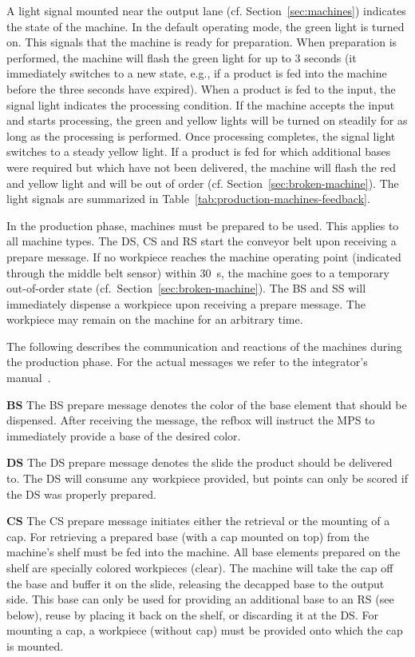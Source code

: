 \documentclass[12pt,twoside]{article}
\newcommand{\refsec}[1]{Section~\ref{#1}}
\newcommand{\reftab}[1]{Table~\ref{#1}}
\begin{document}
A light signal mounted near the output lane
(cf. \refsec{sec:machines}) indicates the state of the machine. In the
default operating mode, the green light is turned on. This signals
that the machine is ready for preparation. When preparation is performed,
the machine will flash the green light for up to 3 seconds (it
immediately switches to a new state, e.g., if a product is fed into the
machine before the three seconds have expired). When a product is fed
to the input, the signal light indicates the processing condition. If
the machine accepts the input and starts processing, the green and yellow lights
will be turned on steadily for as long as the processing is
performed. Once processing completes, the signal light switches to a
steady yellow light. If a product is fed for which additional bases
were required but which have not been delivered, the machine will
flash the red and yellow light and will be out of order
(cf. \refsec{sec:broken-machine}). The light signals are summarized in
\reftab{tab:production-machines-feedback}.

In the production phase, machines must be prepared to be used. This
applies to all machine types.  The DS, CS and RS start the conveyor
belt upon receiving a prepare message. If no workpiece reaches the
machine operating point (indicated through the middle belt sensor)
within \SI{30}{\second}, the machine goes to a temporary out-of-order
state (cf.~\refsec{sec:broken-machine}). The BS and SS will
immediately dispense a workpiece upon receiving a prepare message. The
workpiece may remain on the machine for an arbitrary time.

The following describes the communication and reactions of the
machines during the production phase. For the actual messages we refer
to the integrator's manual~\cite{RefBoxIntManual}.

\smallskip

\noindent\textbf{BS}
The BS prepare message denotes the color of the base element that should
be dispensed. After receiving the message, the refbox will instruct
the MPS to immediately provide a base of the desired color.

\noindent\textbf{DS}
The DS prepare message denotes the slide the product should be delivered
to. The DS will consume any workpiece provided, but points can only be
scored if the DS was properly prepared.

\noindent\textbf{CS}
The CS prepare message initiates either the retrieval or the mounting of
a cap. For retrieving a prepared base (with a cap mounted on top) from
the machine's shelf must be fed into the machine. All base elements
prepared on the shelf are specially colored workpieces (clear). The
machine will take the cap off the base and buffer it on the slide,
releasing the decapped base to the output side. This base can only be
used for providing an additional base to an RS (see below), reuse by
placing it back on the shelf, or discarding it at the DS.  For
mounting a cap, a workpiece (without cap) must be provided onto which
the cap is mounted.
\end{document}
